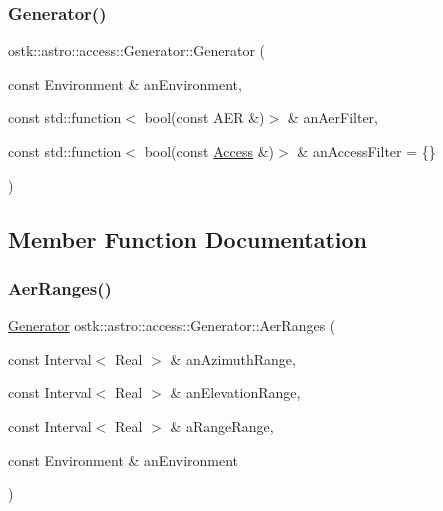 \subsubsection{\texorpdfstring{Generator()}{Generator()}\hspace{0.1cm}{\footnotesize\ttfamily [2/2]}}
{\footnotesize\ttfamily ostk\+::astro\+::access\+::\+Generator\+::\+Generator (\begin{DoxyParamCaption}\item[{const Environment \&}]{an\+Environment,  }\item[{const std\+::function$<$ bool(const A\+ER \&)$>$ \&}]{an\+Aer\+Filter,  }\item[{const std\+::function$<$ bool(const \hyperlink{classostk_1_1astro_1_1_access}{Access} \&)$>$ \&}]{an\+Access\+Filter = {\ttfamily \{\}} }\end{DoxyParamCaption})}



\subsection{Member Function Documentation}
\mbox{\label{classostk_1_1astro_1_1access_1_1_generator_aececdcffcfea35feb07d9214752e6995}} 
\subsubsection{\texorpdfstring{Aer\+Ranges()}{AerRanges()}}
{\footnotesize\ttfamily \hyperlink{classostk_1_1astro_1_1access_1_1_generator}{Generator} ostk\+::astro\+::access\+::\+Generator\+::\+Aer\+Ranges (\begin{DoxyParamCaption}\item[{const Interval$<$ Real $>$ \&}]{an\+Azimuth\+Range,  }\item[{const Interval$<$ Real $>$ \&}]{an\+Elevation\+Range,  }\item[{const Interval$<$ Real $>$ \&}]{a\+Range\+Range,  }\item[{const Environment \&}]{an\+Environment }\end{DoxyParamCaption})\hspace{0.3cm}{\ttfamily [static]}}



